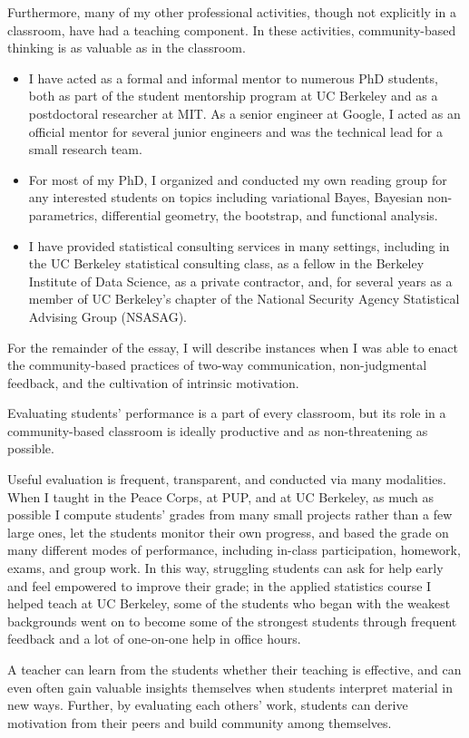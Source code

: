 Furthermore, many of my other professional activities, though not explicitly in a
classroom, have had a teaching component.  In these activities, community-based
thinking is as valuable as in the classroom.
%
\begin{itemize}
    \item I have acted as a formal and informal mentor to numerous PhD students,
    both as part of the student mentorship program at UC Berkeley and as a
    postdoctoral researcher at MIT.  As a senior engineer at Google, I acted as
    an official mentor for several junior engineers and was the technical lead
    for a small research team.
%
    \item For most of my PhD, I organized and conducted my own reading group for
    any interested students on topics including variational Bayes, Bayesian
    non-parametrics, differential geometry, the bootstrap, and functional
    analysis.
%
    \item I have provided statistical consulting services in many settings,
    including in the UC Berkeley statistical consulting class, as a fellow in
    the Berkeley Institute of Data Science, as a private contractor, and, for
    several years as a member of UC Berkeley's chapter of the National Security
    Agency Statistical Advising Group (NSASAG).
%
\end{itemize}
%
For the remainder of the essay, I will describe instances when I was able to
enact the community-based practices of two-way communication, non-judgmental
feedback, and the cultivation of intrinsic motivation.



Evaluating students' performance is a part of every classroom, but its role in a
community-based classroom is ideally productive and as non-threatening as
possible.

Useful evaluation is frequent, transparent, and conducted via many modalities.
When I taught in the Peace Corps, at PUP, and at UC Berkeley, as much as
possible I compute students' grades from many small projects rather than a few
large ones, let the students monitor their own progress, and based the grade on
many different modes of performance, including in-class participation, homework,
exams, and group work.  In this way, struggling students can ask for help early
and feel empowered to improve their grade; in the applied statistics course I
helped teach at UC Berkeley, some of the students who began with the weakest
backgrounds went on to become some of the strongest students through frequent
feedback and a lot of one-on-one help in office hours.


A teacher can learn from the students whether their teaching is effective, and
can even often gain valuable insights themselves when students interpret
material in new ways.  Further, by evaluating each others' work, students
can derive motivation from their peers and build community among themselves.
